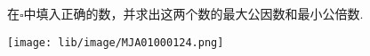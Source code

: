 在$\square$中填入正确的数，并求出这两个数的最大公因数和最小公倍数.\\
\begin{center}
	\texttt{[image: lib/image/MJA01000124.png]}
\end{center}